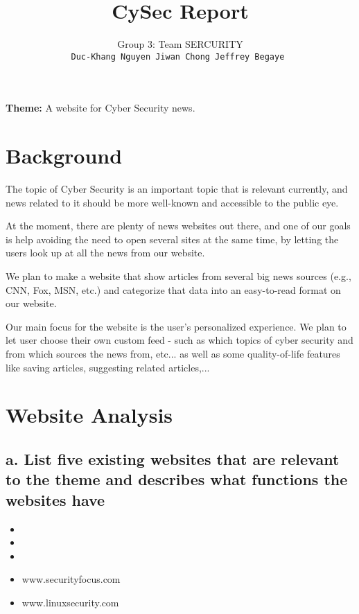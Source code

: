 \documentclass{article}
\title{CySec Report}
\author{
Group 3: Team SERCURITY\\
\texttt{Duc-Khang Nguyen \hspace{0.3in} Jiwan Chong \hspace{0.3in} Jeffrey Begaye }
}
\begin{document}
\maketitle

\textbf{Theme:} A website for Cyber Security news.

\section{Background}

The topic of Cyber Security is an important topic that is relevant currently, and news related to it should be more well-known and accessible to the public eye.

At the moment, there are plenty of news websites out there, and one of our goals is help avoiding the need to open several sites at the same time, by letting the users look up at all the news from our website. 

We plan to make a website that show articles from several big news sources (e.g., CNN, Fox, MSN, etc.) and categorize that data into an easy-to-read format on our website. 

Our main focus for the website is the user's personalized experience. We plan to let user choose their own custom feed - such as which topics of cyber security and from which sources the news from, etc... as well as some quality-of-life features like saving articles, suggesting related articles,...


\section{Website Analysis}

\subsection{a. List five existing websites that are relevant to the theme and describes what functions the websites have}
\begin{itemize}
    \item %
    
    \item %
    
    \item %
    
    \item www.securityfocus.com %
    
    \item www.linuxsecurity.com%
    
\end{itemize}
\end{document}
